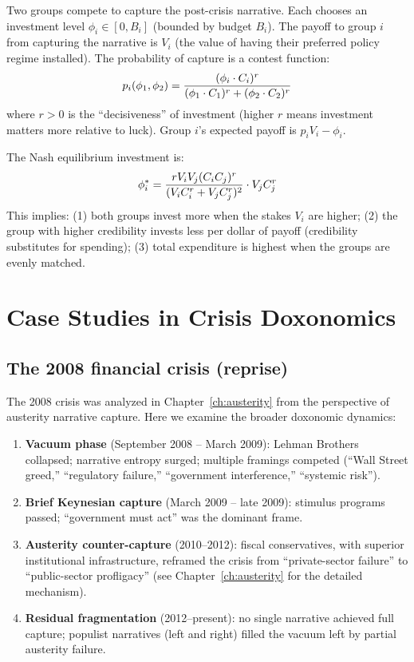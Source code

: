 \begin{model}
\label{mod:narrative-game}
Two groups compete to capture the post-crisis narrative.
Each chooses an investment level $\phi_i \in [0, B_i]$ (bounded by budget $B_i$).
The payoff to group $i$ from capturing the narrative is $V_i$ (the value of having their preferred policy regime installed).
The probability of capture is a contest function:
\[
  p_i(\phi_1, \phi_2) = \frac{(\phi_i \cdot C_{i})^r}{(\phi_1 \cdot C_{1})^r + (\phi_2 \cdot C_{2})^r}
\]
where $r > 0$ is the ``decisiveness'' of investment (higher $r$ means investment matters more relative to luck).
Group $i$'s expected payoff is $p_i V_i - \phi_i$.

The Nash equilibrium investment is:
\[
  \phi_i^* = \frac{r V_i V_j (C_{i} C_{j})^r}{(V_i C_{i}^r + V_j C_{j}^r)^2} \cdot V_j C_{j}^r
\]
This implies: (1) both groups invest more when the stakes $V_i$ are higher; (2) the group with higher credibility invests less per dollar of payoff (credibility substitutes for spending); (3) total expenditure is highest when the groups are evenly matched.
\end{model}

\section{Case Studies in Crisis Doxonomics}
\label{sec:ch29-cases}

\subsection{The 2008 financial crisis (reprise)}

The 2008 crisis was analyzed in Chapter~\ref{ch:austerity} from the perspective of austerity narrative capture.
Here we examine the broader doxonomic dynamics:

\begin{enumerate}[nosep]
  \item \textbf{Vacuum phase} (September 2008 -- March 2009): Lehman Brothers collapsed; narrative entropy surged; multiple framings competed (``Wall Street greed,'' ``regulatory failure,'' ``government interference,'' ``systemic risk'').
  \item \textbf{Brief Keynesian capture} (March 2009 -- late 2009): stimulus programs passed; ``government must act'' was the dominant frame.
  \item \textbf{Austerity counter-capture} (2010--2012): fiscal conservatives, with superior institutional infrastructure, reframed the crisis from ``private-sector failure'' to ``public-sector profligacy'' (see Chapter~\ref{ch:austerity} for the detailed mechanism).
  \item \textbf{Residual fragmentation} (2012--present): no single narrative achieved full capture; populist narratives (left and right) filled the vacuum left by partial austerity failure.
\end{enumerate}

